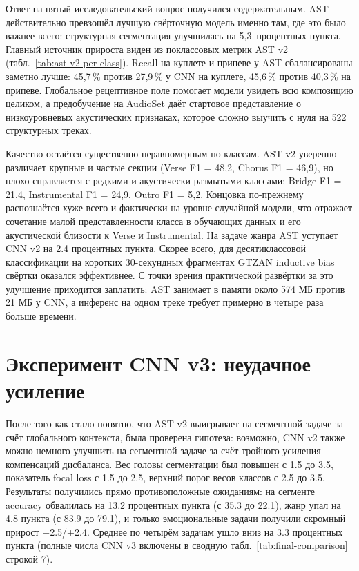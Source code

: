 Ответ на пятый исследовательский вопрос получился содержательным. AST действительно превзошёл лучшую свёрточную модель именно там, где это было важнее всего: структурная сегментация улучшилась на 5{,}3~процентных пункта. Главный источник прироста виден из поклассовых метрик AST v2 (табл.~\ref{tab:ast-v2-per-class}). Recall на куплете и припеве у AST сбалансированы заметно лучше: 45{,}7\,\% против 27{,}9\,\% у CNN на куплете, 45{,}6\,\% против 40{,}3\,\% на припеве. Глобальное рецептивное поле помогает модели увидеть всю композицию целиком, а предобучение на AudioSet даёт стартовое представление о низкоуровневых акустических признаках, которое сложно выучить с нуля на 522 структурных треках.

Качество остаётся существенно неравномерным по классам. AST v2 уверенно различает крупные и частые секции (Verse F1 = 48{,}2, Chorus F1 = 46{,}9), но плохо справляется с редкими и акустически размытыми классами: Bridge F1 = 21{,}4, Instrumental F1 = 24{,}9, Outro F1 = 5{,}2. Концовка по-прежнему распознаётся хуже всего и фактически на уровне случайной модели, что отражает сочетание малой представленности класса в обучающих данных и его акустической близости к Verse и Instrumental. На задаче жанра AST уступает CNN v2 на 2.4 процентных пункта. Скорее всего, для десятиклассовой классификации на коротких 30-секундных фрагментах GTZAN inductive bias свёртки оказался эффективнее. С точки зрения практической развёртки за это улучшение приходится заплатить: AST занимает в памяти около 574 МБ против 21 МБ у CNN, а инференс на одном треке требует примерно в четыре раза больше времени.

\section{Эксперимент CNN v3: неудачное усиление}\label{sec:5-6}

После того как стало понятно, что AST v2 выигрывает на сегментной задаче за счёт глобального контекста, была проверена гипотеза: возможно, CNN v2 также можно немного улучшить на сегментной задаче за счёт тройного усиления компенсаций дисбаланса. Вес головы сегментации был повышен с 1.5 до 3.5, показатель focal loss с 1.5 до 2.5, верхний порог весов классов с 2.5 до 3.5. Результаты получились прямо противоположные ожиданиям: на сегменте accuracy обвалилась на 13.2 процентных пункта (с 35.3 до 22.1), жанр упал на 4.8 пункта (с 83.9 до 79.1), и только эмоциональные задачи получили скромный прирост +2.5/+2.4. Среднее по четырём задачам ушло вниз на 3.3 процентных пункта (полные числа CNN v3 включены в сводную табл.~\ref{tab:final-comparison} строкой 7).

